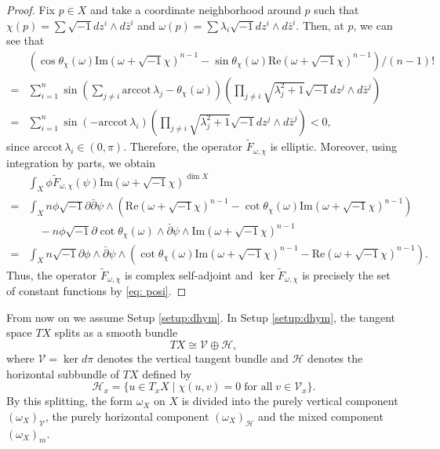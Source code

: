 \documentclass{amsart}
\numberwithin{equation}{section}
\theoremstyle{plain}
\theoremstyle{definition}
\theoremstyle{remark}
\begin{document}
\begin{proof}
Fix $p\in X$ and take a coordinate neighborhood around $p$ such that $\chi(p)=\sum\sqrt{-1}dz^i\wedge d\bar{z}^i$ and $\omega(p)=\sum\lambda_i\sqrt{-1}dz^i\wedge d\bar{z}^i$. Then, at $p$, we can see that
\begin{equation}\label{eq: posi}
\begin{split}
    &\left(\cos\theta_\chi(\omega)\mathrm{Im}(\omega+\sqrt{-1}\chi)^{n-1}-\sin\theta_\chi(\omega)\mathrm{Re}(\omega+\sqrt{-1}\chi)^{n-1}\right)\big/(n-1)! \\
    =&\sum_{i=1}^n \sin \left(\sum_{j\neq i} \mathrm{arccot}\,\lambda_j-\theta_\chi(\omega)\right)\left(\prod_{j\neq i}\sqrt{\lambda_j^2+1}\sqrt{-1}dz^j\wedge d\bar{z}^j\right)\\
    =&\sum_{i=1}^n \sin \left(-\mathrm{arccot}\,\lambda_i\right)\left(\prod_{j\neq i}\sqrt{\lambda_j^2+1}\sqrt{-1}dz^j\wedge d\bar{z}^j\right)<0,
\end{split}
\end{equation}
since $\mathrm{arccot}\, \lambda_i\in (0,\pi)$. Therefore, the operator $\tilde{F}_{\omega,\chi}$ is elliptic.
Moreover, using integration by parts, we obtain
\begin{align*}
    &\int_X \phi \tilde{F}_{\omega,\chi}(\psi)\mathrm{Im}(\omega+\sqrt{-1}\chi)^{\dim X}\\
    =&\int_X n\phi \sqrt{-1}\partial\bar{\partial}\psi\wedge\left(\mathrm{Re}(\omega+\sqrt{-1}\chi)^{n-1}-\cot\theta_\chi(\omega)\mathrm{Im}(\omega+\sqrt{-1}\chi)^{n-1}\right)\\ &\quad -n\phi\sqrt{-1}\partial\cot\theta_\chi(\omega)\wedge\bar{\partial}\psi\wedge\mathrm{Im}(\omega+\sqrt{-1}\chi)^{n-1}\\
    =&\int_Xn\sqrt{-1}\partial\phi\wedge \bar{\partial}\psi\wedge \left(\cot{\theta_\chi(\omega)}\mathrm{Im}(\omega+\sqrt{-1}\chi)^{n-1}-\mathrm{Re}(\omega+\sqrt{-1}\chi)^{n-1}\right).
\end{align*}
Thus, the operator $\tilde{F}_{\omega,\chi}$ is complex self-adjoint and $\ker\tilde{F}_{\omega,\chi}$ is precisely the set of constant functions by \eqref{eq: posi}.
\end{proof}

From now on we assume Setup \ref{setup:dhym}. In Setup \ref{setup:dhym}, the tangent space $TX$ splits as a smooth bundle 
\begin{equation}\label{eq:split}
    TX \cong \mathcal{V} \oplus \mathcal{H}, 
\end{equation}
where $\mathcal{V} = \mathop{\mathrm{ker}}d\pi $ denotes the vertical tangent bundle and $\mathcal{H}$ denotes the horizontal subbundle of $TX$ defined by 
$$ \mathcal{H}_x= \{ u \in T_x X \mid \chi (u, v)=0 \; \textrm{for all} \; v \in \mathcal{V}_x \}.$$ 
By this splitting, the form $\omega_X$ on $X$ is divided into the purely vertical component $(\omega_X)_\mathcal{V}$, the purely horizontal component $(\omega_X)_\mathcal{H}$ and the mixed component $(\omega_X)_m$.
\end{document}
